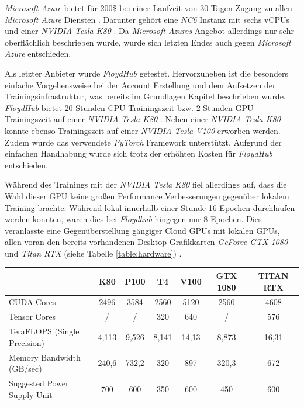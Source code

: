 \textit{Microsoft Azure} bietet für 200\$ bei einer Laufzeit von 30 Tagen Zugang zu allen \textit{Microsoft Azure} Diensten \cite{MicrosoftAzure.2020}. Darunter gehört eine \textit{NC6} Instanz mit sechs vCPUs und einer \textit{NVIDIA Tesla K80} \cite{MicrosoftAzure.202003124}. Da \textit{Microsoft Azures} Angebot allerdings nur sehr oberflächlich beschrieben wurde, wurde sich letzten Endes auch gegen \textit{Microsoft Azure} entschieden. 

Als letzter Anbieter wurde \textit{FloydHub} getestet. Hervorzuheben ist die besonders einfache Vorgehensweise bei der Account Erstellung und dem Aufsetzen der Trainingsinfrastruktur, was bereits im Grundlagen Kapitel beschrieben wurde. \textit{FloydHub} bietet 20 Stunden CPU Trainingszeit bzw. 2 Stunden GPU Trainingszeit auf einer \textit{NVIDIA Tesla K80} \cite{FloydHub.2020}. Neben einer \textit{NVIDIA Tesla K80} konnte ebenso Trainingszeit auf einer \textit{NVIDIA Tesla V100} erworben werden. Zudem wurde das verwendete \textit{PyTorch} Framework unterstützt. Aufgrund der einfachen Handhabung wurde sich trotz der erhöhten Kosten für \textit{FloydHub} entschieden. 

Während des Trainings mit der \textit{NVIDIA Tesla K80} fiel allerdings auf, dass die Wahl dieser GPU keine großen Performance Verbesserungen gegenüber lokalem Training brachte. Während lokal innerhalb einer Stunde 16 Epochen durchlaufen werden konnten, waren dies bei \textit{Floydhub} hingegen nur 8 Epochen. Dies veranlasste eine Gegenüberstellung gängiger Cloud GPUs mit lokalen GPUs, allen voran den bereits vorhandenen Desktop-Grafikkarten \textit{GeForce GTX 1080} und \textit{Titan RTX} (siehe Tabelle \ref{table:hardware}) \cite{TechPowerUp.20200209}.

\begin{center}
	\begin{tabular}[h]{l|c|c|c|c|c|c}
		& K80 & P100 & T4 & V100 & GTX 1080 & TITAN RTX \\
		\hline
		CUDA Cores & 2496 & 3584 & 2560 & 5120 & 2560 & 4608 \\
		Tensor Cores & / & / & 320 & 640 & / & 576 \\
		TeraFLOPS (Single Precision) & 4,113 & 9,526 & 8,141 & 14,13 & 8,873 & 16,31 \\
		Memory Bandwidth (GB/sec) & 240,6 & 732,2 & 320 & 897 & 320,3 & 672 \\
		Suggested Power Supply Unit & 700 & 600 & 350 & 600 & 450 & 600
	\end{tabular}
	\label{table:hardware}
\end{center}

